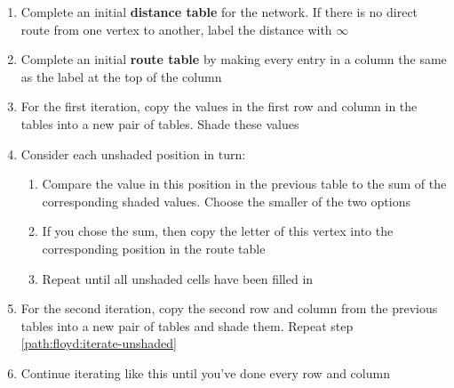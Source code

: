 \documentclass[../main.tex]{subfile}
\begin{document}
\begin{enumerate}
	\item Complete an initial \textbf{distance table} for the network. If there is no direct route from one vertex to another, label the distance with $\infty$
	\item Complete an initial \textbf{route table} by making every entry in a column the same as the label at the top of the column
	\item For the first iteration, copy the values in the first row and column in the tables into a new pair of tables. Shade these values
	\item\label{path:floyd:iterate-unshaded} Consider each unshaded position in turn: \begin{enumerate}
		\item Compare the value in this position in the previous table to the sum of the corresponding shaded values. Choose the smaller of the two options
		\item If you chose the sum, then copy the letter of this vertex into the corresponding position in the route table
		\item Repeat until all unshaded cells have been filled in
	\end{enumerate}
	\item For the second iteration, copy the second row and column from the previous tables into a new pair of tables and shade them. Repeat step \ref{path:floyd:iterate-unshaded}
	\item Continue iterating like this until you've done every row and column
\end{enumerate}
\end{document}
